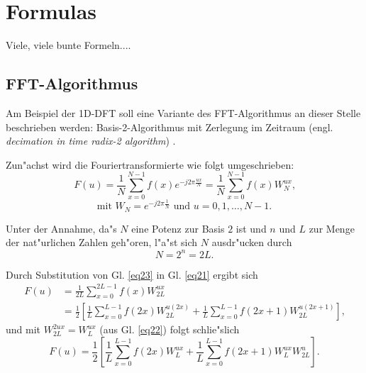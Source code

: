 \chapter{Formulas}
\label{formeln}
\thispagestyle{empty}

Viele, viele bunte Formeln....


\section{FFT-Algorithmus}

Am  Beispiel der 1D-DFT soll eine Variante des FFT-Algorithmus
an  dieser  Stelle  beschrieben werden: Basis-2-Algorithmus
mit Zerlegung im Zeitraum (engl. {\em decimation in time 
radix-2  algorithm}) \cite{Aach2005}.

 Zun"achst wird die Fouriertransformierte wie folgt umgeschrieben:
\begin{equation} 
 \label{eq21}
F(u) = \frac{1}{N} \sum \limits_{x=0}^{N-1}f(x) e^{ -j 2 \pi \frac{u x}{N} }
  = \frac{1}{N} \sum \limits_{x=0}^{N-1}f(x) W_{N}^{ux}
\textrm{,}
\end{equation}
\begin{equation}
\label{eq22}
\textrm{mit  }
  W_{N} = e^{ -j 2 \pi \frac{1}{N} }
\textrm{  und  $u=0,1,\dots,N-1$.}
\end{equation}

Unter  der Annahme, da"s $N$ eine Potenz zur Basis $2$ ist  und
$n$ und $L$ zur Menge der nat"urlichen Zahlen geh"oren, l"a"st sich
$N$ ausdr"ucken durch
\begin{equation}
\label{eq23}
N=2^{n}=2L
\textrm{.}
\end{equation}

Durch Substitution von Gl. \ref{eq23} in Gl. \ref{eq21} ergibt sich
\begin{align} 
\label{eq24}
F(u) &= \frac{1}{2L} \sum \limits_{x=0}^{2L-1}f(x) W_{2L}^{ux} \nonumber \\
  &= \frac{1}{2} \left [ \frac{1}{L} \sum \limits_{x=0}^{L-1}f(2x) W_{2L}^{u(2x)} +
     \frac{1}{L} \sum \limits_{x=0}^{L-1}f(2x+1) W_{2L}^{u(2x+1)} \right ]
\textrm{,}
\end{align}
und mit $W_{2L}^{2ux} = W_{L}^{ux}$ (aus Gl. \ref{eq22}) folgt schlie"slich
\begin{equation}
\label{eq25}
F(u) = \frac{1}{2} \left [ \frac{1}{L} \sum \limits_{x=0}^{L-1}f(2x) W_{L}^{ux}+
     \frac{1}{L} \sum \limits_{x=0}^{L-1}f(2x+1) W_{L}^{ux} W_{2L}^{u} \right ]
\textrm{.}
\end{equation}

